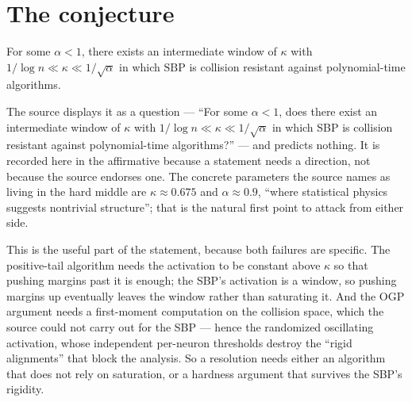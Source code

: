 \documentclass{aicr-conjecture}
\newcommand{\SBP}{\mathrm{SBP}}
\begin{document}
\section{The conjecture}\label{sec:conjectures}

\begin{conjecture}\label{conj:main}
For some $\alpha < 1$, there exists an intermediate window of $\kappa$
with $1/\log n \ll \kappa \ll 1/\sqrt{\alpha}$ in which $\SBP$ is
collision resistant against polynomial-time algorithms.
\end{conjecture}

\begin{remark}\label{rem:phrasing}
The source displays it as a question --- ``For some $\alpha < 1$, does
there exist an intermediate window of $\kappa$ with $1/\log n \ll \kappa
\ll 1/\sqrt{\alpha}$ in which SBP is collision resistant against
polynomial-time algorithms?'' --- and predicts nothing. It is recorded here
in the affirmative because a statement needs a direction, not because the
source endorses one. The concrete parameters the source names as living
in the hard middle are $\kappa \approx 0.675$ and $\alpha \approx 0.9$,
``where statistical physics suggests nontrivial structure''; that is the
natural first point to attack from either side.
\end{remark}

\begin{remark}\label{rem:obstruction}
This is the useful part of the statement, because both failures are
specific. The positive-tail algorithm needs the activation to be constant
above $\kappa$ so that pushing margins past it is enough; the SBP's
activation is a window, so pushing margins up eventually leaves the
window rather than saturating it. And the OGP argument needs a
first-moment computation on the collision space, which the source could
not carry out for the SBP --- hence the randomized oscillating activation,
whose independent per-neuron thresholds destroy the ``rigid alignments''
that block the analysis. So a resolution needs either an algorithm that
does not rely on saturation, or a hardness argument that survives the
SBP's rigidity.
\end{remark}
\end{document}
